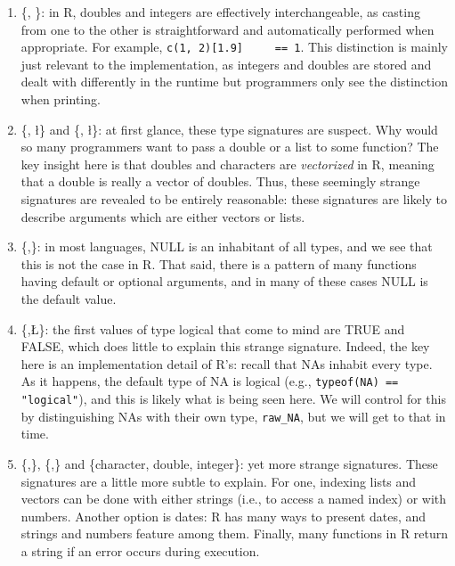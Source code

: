 \documentclass[acmsmall,10pt,review,anonymous]{acmart}\settopmatter{printfolios=true,printccs=false,printacmref=false}
\newcommand{\code}[1]{\lstinline|#1|\xspace}
\begin{document}
\begin{enumerate}
\item \{\D, \I\}: in R, doubles and integers are effectively
  interchangeable, as casting from one to the other is straightforward and
  automatically performed when appropriate.  For example, \code{c(1, 2)[1.9]
    == 1}.  This distinction is mainly just relevant to the implementation,
  as integers and doubles are stored and dealt with differently in the
  runtime but programmers only see the distinction when printing.
	
\item \{\D, \l\} and \{\C, \l\}: at first glance, these type signatures are
  suspect.  Why would so many programmers want to pass a double or a list to
  some function?  The key insight here is that doubles and characters are
  {\it vectorized} in R, meaning that a double is really a vector of
  doubles.  Thus, these seemingly strange signatures are revealed to be
  entirely reasonable: these signatures are likely to describe arguments
  which are either vectors or lists.
	
\item \{\ANY,\sN\}: in most languages, NULL is an inhabitant of all types,
  and we see that this is not the case in R.  That said, there is a pattern
  of many functions having default or optional arguments, and in many of
  these cases NULL is the default value.
	
\item \{\D,\L\}: the first values of type logical that come to mind are TRUE
  and FALSE, which does little to explain this strange signature.  Indeed,
  the key here is an implementation detail of R's: recall that NAs inhabit
  every type.  As it happens, the default type of NA is logical (e.g.,
  \code{typeof(NA) == "logical"}), and this is likely what is being seen
  here.  We will control for this by distinguishing NAs with their own type,
  {\tt raw\_NA}, but we will get to that in time.
	
\item \{\C,\D\}, \{\C,\I\} and \{character, double, integer\}: yet more
  strange signatures.  These signatures are a little more subtle to explain.
  For one, indexing lists and vectors can be done with either strings (i.e.,
  to access a named index) or with numbers.  Another option is dates: R has
  many ways to present dates, and strings and numbers feature among them.
  Finally, many  functions in R return a string if an error
  occurs during execution.

\end{enumerate}
\end{document}
